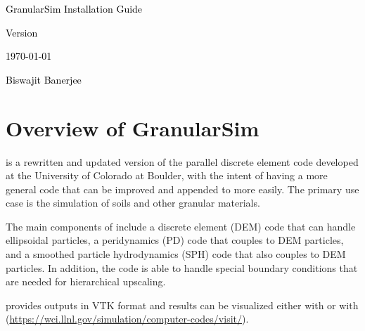 \documentclass[11pt,fleqn]{book} %
\begin{document}
  \begingroup
    \thispagestyle{empty}
    \AddToShipoutPicture*{\BackgroundPic} %
    \centering
    \vspace*{1cm}
    \par\normalfont\fontsize{35}{35}\sffamily\selectfont
    \textcolor{black}{GranularSim Installation Guide}\par %
    \vspace*{0.5cm}
    {\Large \textcolor{black}{Version \version}}\par
    {\Large \textcolor{black}{\today}}\par
    \vspace*{13cm}
    {\Large \textcolor{black}{Biswajit Banerjee}}\par %
  \endgroup

  

\chapter{Overview of GranularSim} \label{sec:overview} 
\GranularSim is a rewritten and updated version of the parallel discrete element code \ParaEllip
developed at the University of Colorado at Boulder, with the intent of having a more general
code that can be improved and appended to more easily.  The primary use case is the simulation
of soils and other granular materials.

The main components of \GranularSim include a discrete element (DEM) code that can handle
ellipsoidal particles, a peridynamics (PD) code that couples to DEM particles, and
a smoothed particle hydrodynamics (SPH) code that also couples to DEM particles.
In addition, the code is able to handle special boundary conditions that are needed
for hierarchical upscaling.

\GranularSim provides outputs in VTK format and results can be visualized either
with \ParaView or with \Visit (\url{https://wci.llnl.gov/simulation/computer-codes/visit/}).
\end{document}
